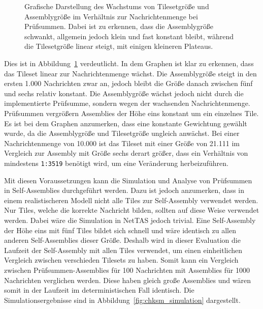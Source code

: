 \begin{figure}
    \centering 
    \caption[Wachstum des Tilesets in Prüfsummen-Assemblies]{Grafische Darstellung des Wachstums von Tilesetgröße und Assemblygröße im Verhältnis zur Nachrichtenmenge bei Prüfsummen. Dabei ist zu erkennen, dass die Assemblygröße schwankt, allgemein jedoch klein und fast konstant bleibt, während die Tilesetgröße linear steigt, mit einigen kleineren Plateaus.}
    \label{fig:chksm_growth}
\end{figure}


Dies ist in Abbildung~\ref{fig:chksm_growth} verdeutlicht. In dem Graphen ist klar zu erkennen, dass das Tileset linear zur Nachrichtenmenge wächst. Die Assemblygröße steigt in den ersten 1.000 Nachrichten zwar an, jedoch bleibt die Größe danach zwischen fünf und sechs relativ konstant. Die Assemblygröße wächst jedoch nicht durch die implementierte Prüfsumme, sondern wegen der wachsenden Nachrichtenmenge. Prüfsummen vergrößern Assemblies der Höhe eins konstant um ein einzelnes Tile.
Es ist bei dem Graphen anzumerken, dass eine konstante Gewichtung gewählt wurde, da die Assemblygröße und Tilesetgröße ungleich anwächst. 
Bei einer Nachrichtenmenge von 10.000 ist das Tileset mit einer Größe von 21.111 im Vergleich zur Assembly mit Größe sechs derart größer, dass ein Verhältnis von mindestens \texttt{1:3519} benötigt wird, um eine Veränderung herbeizuführen.

Mit diesen Voraussetzungen kann die Simulation und Analyse von Prüfsummen in Self-Assemblies durchgeführt werden. Dazu ist jedoch anzumerken, dass in einem realistischeren Modell nicht alle Tiles zur Self-Assembly verwendet werden. Nur Tiles, welche die korrekte Nachricht bilden, sollten auf diese Weise verwendet werden. Dabei wäre die Simulation in NetTAS jedoch trivial. Eine Self-Assembly der Höhe eins mit fünf Tiles bildet sich schnell und wäre identisch zu allen anderen Self-Assemblies dieser Größe. Deshalb wird in dieser Evaluation die Laufzeit der Self-Assembly mit allen Tiles verwendet, um einen einheitlichen Vergleich zwischen verschieden Tilesets zu haben. Somit kann ein Vergleich zwischen Prüfsummen-Assemblies für 100 Nachrichten mit Assemblies für 1000 Nachrichten verglichen werden. Diese haben gleich große Assemblies und wären somit in der Laufzeit im deterministischen Fall identisch. Die Simulationsergebnisse sind in Abbildung~\ref{fig:chksm_simulation} dargestellt.


